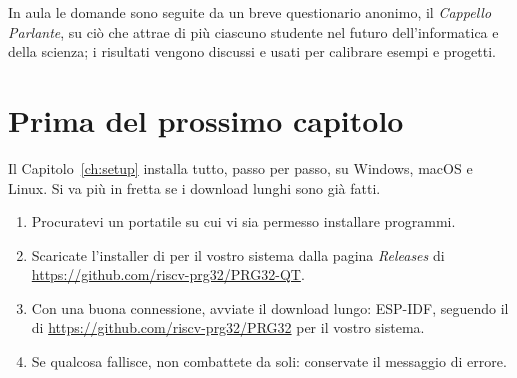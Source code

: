 In aula le domande sono seguite da un breve questionario anonimo, il
\emph{Cappello Parlante}, su ciò che attrae di più ciascuno studente nel futuro
dell'informatica e della scienza; i risultati vengono discussi e usati per
calibrare esempi e progetti.



\section{Prima del prossimo capitolo}

Il Capitolo~\ref{ch:setup} installa tutto, passo per passo, su Windows, macOS
e Linux. Si va più in fretta se i download lunghi sono già fatti.

\begin{exercise}[preparazione]
\begin{enumerate}[nosep]
\item Procuratevi un portatile su cui vi sia permesso installare programmi.
\item Scaricate l'installer di \prgqt per il vostro sistema dalla pagina
  \emph{Releases} di \url{https://github.com/riscv-prg32/PRG32-QT}.
\item Con una buona connessione, avviate il download lungo: ESP-IDF, seguendo
  il  di \url{https://github.com/riscv-prg32/PRG32} per il vostro
  sistema.
\item Se qualcosa fallisce, non combattete da soli: conservate il messaggio di
  errore.
\end{enumerate}
\end{exercise}



